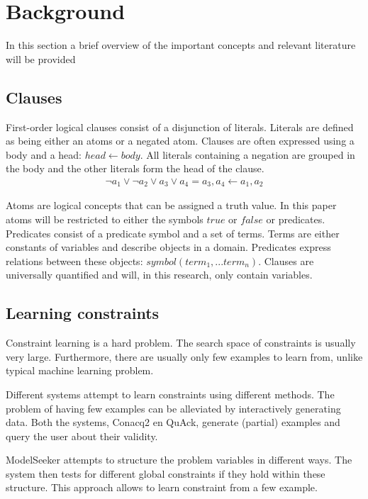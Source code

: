 \documentclass{llncs}
\begin{document}
\section{Background}
In this section a brief overview of the important concepts and relevant literature will be provided

\subsection{Clauses}
First-order logical clauses consist of a disjunction of literals.
Literals are defined as being either an atoms or a negated atom.
Clauses are often expressed using a body and a head: $\mathit{head} \leftarrow \mathit{body}$.
All literals containing a negation are grouped in the body and the other literals form the head of the clause.
\begin{eqnarray*}
  \lnot a_1 \lor \lnot a_2 \lor a_3 \lor a_4 = a_3, a_4 \leftarrow a_1, a_2 
\end{eqnarray*}

Atoms are logical concepts that can be assigned a truth value.
In this paper atoms will be restricted to either the symbols $\mathit{true}$ or $\mathit{false}$ or predicates.
Predicates consist of a predicate symbol and a set of terms.
Terms are either constants of variables and describe objects in a domain.
Predicates express relations between these objects: $\mathit{symbol}(\mathit{term_1}, ... \mathit{term_n})$.
Clauses are universally quantified and will, in this research, only contain variables.

\subsection{Learning constraints}
Constraint learning is a hard problem.
The search space of constraints is usually very large.
Furthermore, there are usually only few examples to learn from, unlike typical machine learning problem.

Different systems attempt to learn constraints using different methods.
The problem of having few examples can be alleviated by interactively generating data.
Both the systems, Conacq2\cite{bessiere2007query} en QuAck\cite{bessiere2013constraint}, generate (partial) examples and query the user about their validity.

ModelSeeker\cite{Beldiceanu:ModelSeeker} attempts to structure the problem variables in different ways.
The system then tests for different global constraints if they hold within these structure.
This approach allows to learn constraint from a few example.
\end{document}
